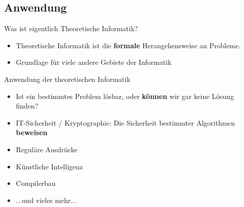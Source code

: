 %
%
%
%

\subsection{Anwendung}
\begin{frame}[fragile]{Was ist eigentlich Theoretische Informatik?}
    \begin{itemize}
        \item Theoretische Informatik ist die \textbf{formale} Herangehensweise an Probleme.\\
        \item Grundlage für viele andere Gebiete der Informatik
    \end{itemize}
\end{frame}

\begin{frame}{Anwendung der theoretischen Informatik}
    \begin{itemize}
        \item Ist ein bestimmtes Problem lösbar, oder \textbf{können} wir gar keine Lösung finden?
        \item IT-Sicherheit / Kryptographie: Die Sicherheit bestimmter Algorithmen \textbf{beweisen}
        \item Reguläre Ausdrücke
        \item Künstliche Intelligenz
        \item Compilerbau
        \item ...und vieles mehr...
    \end{itemize}
\end{frame}

